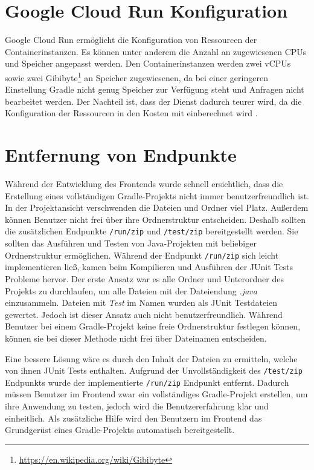 \section{Google Cloud Run Konfiguration}
Google Cloud Run ermöglicht die Konfiguration von Ressourcen der
Containerinstanzen. Es können unter anderem die Anzahl an zugewiesenen CPUs \cite{CloudRunCpuAlloc} und
Speicher \cite{CloudRunMemLimits} angepasst werden.
Den Containerinstanzen werden zwei vCPUs sowie zwei Gibibyte\footnote{\url{https://en.wikipedia.org/wiki/Gibibyte}}
an Speicher zugewiesenen, da bei einer geringeren Einstellung Gradle
nicht genug Speicher zur Verfügung steht und Anfragen nicht bearbeitet werden.
Der Nachteil ist, dass der Dienst dadurch teurer wird,
da die Konfiguration der Ressourcen in den Kosten mit einberechnet wird \cite{CloudRunPricing}.

\section{Entfernung von Endpunkte}
Während der Entwicklung des Frontends wurde schnell ersichtlich,
dass die Erstellung eines vollständigen Gradle-Projekts nicht immer benutzerfreundlich ist.
In der Projektansicht verschwenden die Dateien und Ordner viel Platz.
Außerdem können Benutzer nicht frei über ihre Ordnerstruktur entscheiden.
Deshalb sollten die zusätzlichen Endpunkte \texttt{/run/zip} und \texttt{/test/zip}
bereitgestellt werden. Sie sollten das Ausführen und Testen von Java-Projekten mit
beliebiger Ordnerstruktur ermöglichen.
Während der Endpunkt \texttt{/run/zip} sich leicht implementieren ließ, kamen
beim Kompilieren und Ausführen der JUnit Tests Probleme hervor.
Der erste Ansatz war es alle Ordner und Unterordner des Projekts zu
durchlaufen, um alle Dateien mit der Dateiendung \emph{.java} einzusammeln.
Dateien mit \emph{Test} im Namen wurden als JUnit Testdateien gewertet. Jedoch
ist dieser Ansatz auch nicht benutzerfreundlich. Während Benutzer
bei einem Gradle-Projekt keine freie Ordnerstruktur festlegen können,
können sie bei dieser Methode nicht frei über Dateinamen entscheiden.

Eine bessere Lösung wäre es durch den Inhalt der Dateien zu ermitteln,
welche von ihnen JUnit Tests enthalten. Aufgrund der Unvollständigkeit
des \texttt{/test/zip} Endpunkts wurde der implementierte
\texttt{/run/zip} Endpunkt entfernt. Dadurch müssen Benutzer im
Frontend zwar ein vollständiges Gradle-Projekt erstellen,
um ihre Anwendung zu testen,
jedoch wird die Benutzererfahrung klar und einheitlich.
Als zusätzliche Hilfe wird den Benutzern im Frontend das Grundgerüst eines Gradle-Projekts
automatisch bereitgestellt.

